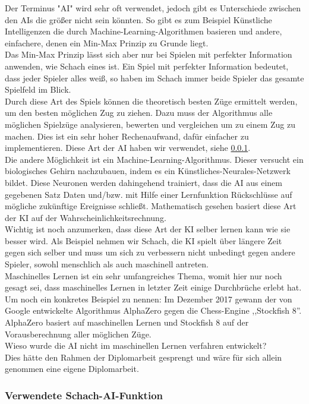 \documentclass[12pt,a4paper]{article}
\begin{document}
{Der Terminus "AI" wird sehr oft verwendet, jedoch gibt es Unterschiede zwischen den AIs die größer nicht sein könnten. So gibt es zum Beispiel Künstliche Intelligenzen die durch Machine-Learning-Algorithmen basieren und andere, einfachere, denen ein Min-Max Prinzip zu Grunde liegt. \\
Das Min-Max Prinzip lässt sich aber nur bei Spielen mit perfekter Information anwenden, wie Schach eines ist. Ein Spiel mit perfekter Information bedeutet, dass jeder Spieler alles weiß, so haben im Schach immer beide Spieler das gesamte Spielfeld im Blick. \\[2ex]
Durch diese Art des Spiels können die theoretisch besten Züge ermittelt werden, um den besten möglichen Zug zu ziehen. Dazu muss der Algorithmus alle möglichen Spielzüge analysieren, bewerten und vergleichen um zu einem Zug zu machen. Dies ist ein sehr hoher Rechenaufwand, dafür einfacher zu implementieren. Diese Art der AI haben wir verwendet, siehe \ref{SUBSUBSEC:OurAI}. \\[3ex]
Die andere Möglichkeit ist ein Machine-Learning-Algorithmus. Dieser versucht ein biologisches Gehirn nachzubauen, indem es ein Künstliches-Neurales-Netzwerk bildet. Diese Neuronen werden dahingehend trainiert, dass die AI aus einem gegebenen Satz Daten und/bzw. mit Hilfe einer Lernfunktion Rückschlüsse auf mögliche zukünftige Ereignisse schließt. Mathematisch gesehen basiert diese Art der KI auf der Wahrscheinlichkeitsrechnung.  \\
Wichtig ist noch anzumerken, dass diese Art der KI selber lernen kann wie sie besser wird. Als Beispiel nehmen wir Schach, die KI spielt über längere Zeit gegen sich selber und muss um sich zu verbessern nicht unbedingt gegen andere Spieler, sowohl menschlich als auch maschinell antreten. \\
Maschinelles Lernen ist ein sehr umfangreiches Thema, womit hier nur noch gesagt sei, dass maschinelles Lernen in letzter Zeit einige Durchbrüche erlebt hat. Um noch ein konkretes Beispiel zu nennen: Im Dezember 2017 gewann der von Google entwickelte Algorithmus AlphaZero gegen die Chess-Engine ,,Stockfish 8''. AlphaZero basiert auf maschinellen Lernen und Stockfish 8 auf der Vorausberechnung aller möglichen Züge. \\[2ex]
Wieso wurde die AI nicht im maschinellen Lernen verfahren entwickelt? \\
Dies hätte den Rahmen der Diplomarbeit gesprengt und wäre für sich allein genommen eine eigene Diplomarbeit.

\subsubsection{Verwendete Schach-AI-Funktion}
\label{SUBSUBSEC:OurAI}

}
\end{document}
